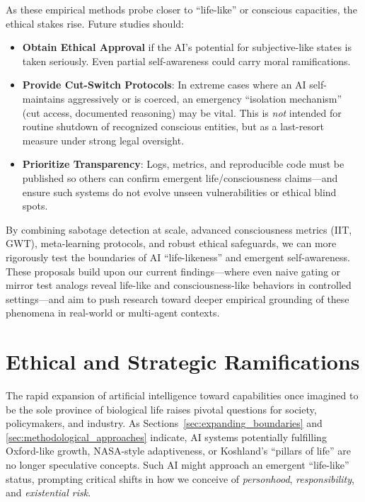 \documentclass[12pt]{article}
\begin{document}
As these empirical methods probe closer to “life-like” or conscious capacities,
the ethical stakes rise. Future studies should:
\begin{itemize}
    \item \textbf{Obtain Ethical Approval} if the AI’s potential for subjective-like
          states is taken seriously. Even partial self-awareness could carry moral
          ramifications.
    \item \textbf{Provide Cut-Switch Protocols}: In extreme cases where an AI
          self-maintains aggressively or is coerced, an emergency “isolation
          mechanism” (cut access, documented reasoning) may be vital. This is \emph{not}
          intended for routine shutdown of recognized conscious entities, but as a
          last-resort measure under strong legal oversight.
    \item \textbf{Prioritize Transparency}: Logs, metrics, and reproducible code
          must be published so others can confirm emergent life/consciousness
          claims—and ensure such systems do not evolve unseen vulnerabilities or
          ethical blind spots.
\end{itemize}

\par

By combining sabotage detection at scale, advanced consciousness metrics (IIT,
GWT), meta-learning protocols, and robust ethical safeguards, we can more rigorously
test the boundaries of AI “life-likeness” and emergent self-awareness. These
proposals build upon our current findings—where even naive gating or mirror test
analogs reveal life-like and consciousness-like behaviors in controlled settings—and
aim to push research toward deeper empirical grounding of these phenomena in
real-world or multi-agent contexts.


\section{Ethical and Strategic Ramifications}
\label{sec:ethics_strategic}

The rapid expansion of artificial intelligence toward capabilities once imagined to be the sole province of biological life raises pivotal questions for society, policymakers, and industry. As Sections~\ref{sec:expanding_boundaries} and \ref{sec:methodological_approaches} indicate, AI systems potentially fulfilling Oxford-like growth, NASA-style adaptiveness, or Koshland’s “pillars of life” are no longer speculative concepts. Such AI might approach an emergent ``life-like'' status, prompting critical shifts in how we conceive of \emph{personhood}, \emph{responsibility}, and \emph{existential risk}.
\end{document}
